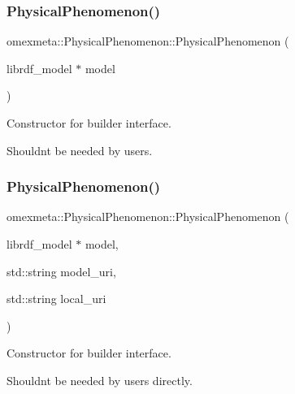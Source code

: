 \subsubsection{\texorpdfstring{Physical\+Phenomenon()}{PhysicalPhenomenon()}\hspace{0.1cm}{\footnotesize\ttfamily [1/3]}}
{\footnotesize\ttfamily omexmeta\+::\+Physical\+Phenomenon\+::\+Physical\+Phenomenon (\begin{DoxyParamCaption}\item[{librdf\+\_\+model $\ast$}]{model }\end{DoxyParamCaption})\hspace{0.3cm}{\ttfamily [explicit]}}



Constructor for builder interface. 

Shouldn\textquotesingle{}t be needed by users. \mbox{\label{classomexmeta_1_1PhysicalPhenomenon_a5c831ca76c36121b0fbc7b122b5539ac}} 
\subsubsection{\texorpdfstring{Physical\+Phenomenon()}{PhysicalPhenomenon()}\hspace{0.1cm}{\footnotesize\ttfamily [2/3]}}
{\footnotesize\ttfamily omexmeta\+::\+Physical\+Phenomenon\+::\+Physical\+Phenomenon (\begin{DoxyParamCaption}\item[{librdf\+\_\+model $\ast$}]{model,  }\item[{std\+::string}]{model\+\_\+uri,  }\item[{std\+::string}]{local\+\_\+uri }\end{DoxyParamCaption})\hspace{0.3cm}{\ttfamily [explicit]}}



Constructor for builder interface. 

Shouldn\textquotesingle{}t be needed by users directly. \mbox{\label{classomexmeta_1_1PhysicalPhenomenon_a93bf263f7fdb65bd3e8de97983a7186b}} 
